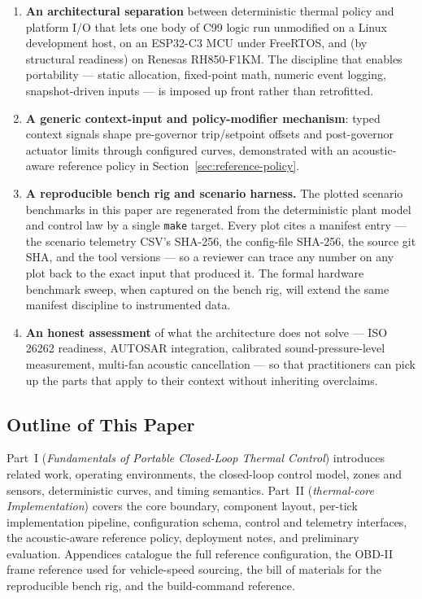 \begin{enumerate}[leftmargin=*]
    \item \textbf{An architectural separation} between deterministic thermal policy and platform I/O that lets one body of C99 logic run unmodified on a Linux development host, on an ESP32-C3 MCU under FreeRTOS, and (by structural readiness) on Renesas RH850-F1KM. The discipline that enables portability --- static allocation, fixed-point math, numeric event logging, snapshot-driven inputs --- is imposed up front rather than retrofitted.
    \item \textbf{A generic context-input and policy-modifier mechanism}: typed context signals shape pre-governor trip/setpoint offsets and post-governor actuator limits through configured curves, demonstrated with an acoustic-aware reference policy in Section~\ref{sec:reference-policy}.
    \item \textbf{A reproducible bench rig and scenario harness.} The plotted scenario benchmarks in this paper are regenerated from the deterministic plant model and control law by a single \texttt{make} target. Every plot cites a manifest entry --- the scenario telemetry CSV's SHA-256, the config-file SHA-256, the source git SHA, and the tool versions --- so a reviewer can trace any number on any plot back to the exact input that produced it. The formal hardware benchmark sweep, when captured on the bench rig, will extend the same manifest discipline to instrumented data.
    \item \textbf{An honest assessment} of what the architecture does not solve --- ISO 26262 readiness, AUTOSAR integration, calibrated sound-pressure-level measurement, multi-fan acoustic cancellation --- so that practitioners can pick up the parts that apply to their context without inheriting overclaims.
\end{enumerate}

\subsection{Outline of This Paper}

Part~I (\emph{Fundamentals of Portable Closed-Loop Thermal Control}) introduces related work, operating environments, the closed-loop control model, zones and sensors, deterministic curves, and timing semantics. Part~II (\emph{thermal-core Implementation}) covers the core boundary, component layout, per-tick implementation pipeline, configuration schema, control and telemetry interfaces, the acoustic-aware reference policy, deployment notes, and preliminary evaluation. Appendices catalogue the full reference configuration, the OBD-II frame reference used for vehicle-speed sourcing, the bill of materials for the reproducible bench rig, and the build-command reference.

\endinput
